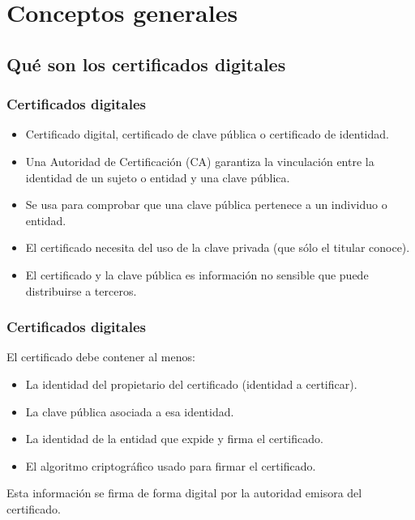 \documentclass{beamer}
\begin{document}
\usebackgroundtemplate{}


\section{Conceptos generales}

\subsection{Qué son los certificados digitales}
\begin{frame}
\frametitle{Certificados digitales}

\begin{itemize}
\item Certificado digital, certificado de clave pública o certificado de identidad.
\item Una Autoridad de Certificación (CA) garantiza la vinculación entre la identidad de un sujeto o entidad y una clave pública.
\item Se usa para comprobar que una clave pública pertenece a un individuo o entidad.
\item El certificado necesita del uso de la clave privada (que sólo el titular conoce).
\item El certificado y la clave pública es información no sensible que puede distribuirse a terceros.
\end{itemize}

\end{frame}

\begin{frame}
\frametitle{Certificados digitales}

El certificado debe contener al menos:
\begin{itemize}
\item La identidad del propietario del certificado (identidad a certificar).
\item La clave pública asociada a esa identidad.
\item La identidad de la entidad que expide y firma el certificado.
\item El algoritmo criptográfico usado para firmar el certificado.
\end{itemize}

\smallskip

Esta información se firma de forma digital por la autoridad emisora del certificado.

\end{frame}
\end{document}
